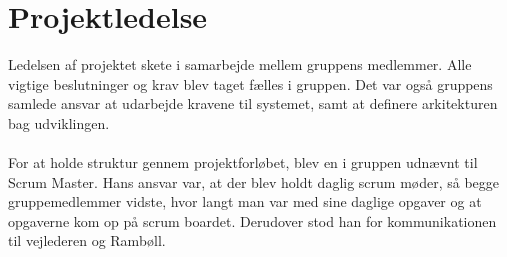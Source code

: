\section{Projektledelse}
Ledelsen af projektet skete i samarbejde mellem gruppens medlemmer. Alle vigtige beslutninger og krav blev taget fælles i gruppen.
Det var også gruppens samlede ansvar at udarbejde kravene til systemet, samt at definere arkitekturen bag udviklingen. \\ \\
For at holde struktur gennem projektforløbet, blev en i gruppen udnævnt til Scrum Master. Hans ansvar var, at der blev holdt daglig scrum møder, så begge gruppemedlemmer vidste, hvor langt man var med sine daglige opgaver og at opgaverne kom op på scrum boardet. Derudover stod han for kommunikationen til vejlederen og Rambøll. \\
